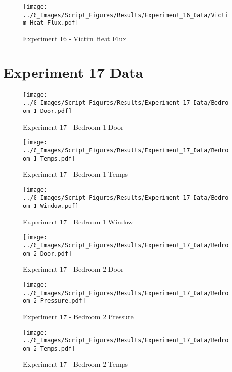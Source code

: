 	\begin{figure}[H]
		\centering
		\texttt{[image: ../0\_Images/Script\_Figures/Results/Experiment\_16\_Data/Victim\_Heat\_Flux.pdf]}
		\caption[]{Experiment 16 - Victim Heat Flux}
	\end{figure}
 
	\clearpage

\clearpage		\large
\section{Experiment 17 Data} \label{App:Exp17Results} 

	\begin{figure}[H]
		\centering
		\texttt{[image: ../0\_Images/Script\_Figures/Results/Experiment\_17\_Data/Bedroom\_1\_Door.pdf]}
		\caption[]{Experiment 17 - Bedroom 1 Door}
	\end{figure}
 

	\begin{figure}[H]
		\centering
		\texttt{[image: ../0\_Images/Script\_Figures/Results/Experiment\_17\_Data/Bedroom\_1\_Temps.pdf]}
		\caption[]{Experiment 17 - Bedroom 1 Temps}
	\end{figure}
 
	\clearpage

	\begin{figure}[H]
		\centering
		\texttt{[image: ../0\_Images/Script\_Figures/Results/Experiment\_17\_Data/Bedroom\_1\_Window.pdf]}
		\caption[]{Experiment 17 - Bedroom 1 Window}
	\end{figure}
 

	\begin{figure}[H]
		\centering
		\texttt{[image: ../0\_Images/Script\_Figures/Results/Experiment\_17\_Data/Bedroom\_2\_Door.pdf]}
		\caption[]{Experiment 17 - Bedroom 2 Door}
	\end{figure}
 
	\clearpage

	\begin{figure}[H]
		\centering
		\texttt{[image: ../0\_Images/Script\_Figures/Results/Experiment\_17\_Data/Bedroom\_2\_Pressure.pdf]}
		\caption[]{Experiment 17 - Bedroom 2 Pressure}
	\end{figure}
 

	\begin{figure}[H]
		\centering
		\texttt{[image: ../0\_Images/Script\_Figures/Results/Experiment\_17\_Data/Bedroom\_2\_Temps.pdf]}
		\caption[]{Experiment 17 - Bedroom 2 Temps}
	\end{figure}
 
